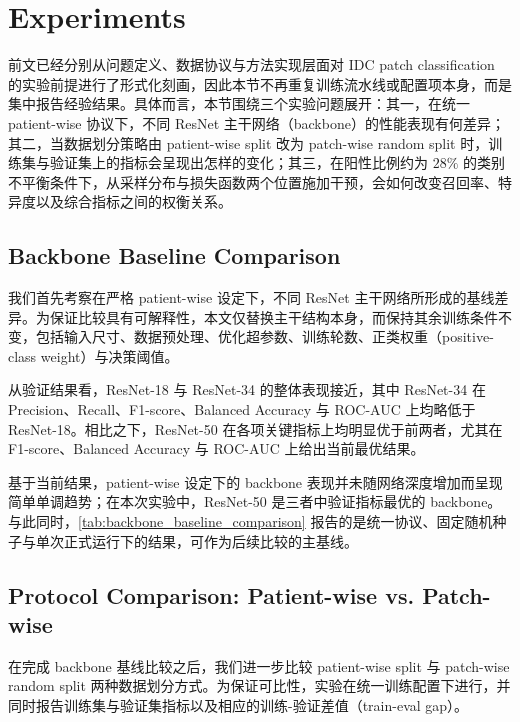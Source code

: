 \section{Experiments}
\label{sec:experiments}

前文已经分别从问题定义、数据协议与方法实现层面对 IDC patch classification 的实验前提进行了形式化刻画，因此本节不再重复训练流水线或配置项本身，而是集中报告经验结果。具体而言，本节围绕三个实验问题展开：其一，在统一 patient-wise 协议下，不同 ResNet 主干网络（backbone）的性能表现有何差异；其二，当数据划分策略由 patient-wise split 改为 patch-wise random split 时，训练集与验证集上的指标会呈现出怎样的变化；其三，在阳性比例约为 $28\%$ 的类别不平衡条件下，从采样分布与损失函数两个位置施加干预，会如何改变召回率、特异度以及综合指标之间的权衡关系。

\subsection{Backbone Baseline Comparison}

我们首先考察在严格 patient-wise 设定下，不同 ResNet 主干网络所形成的基线差异。为保证比较具有可解释性，本文仅替换主干结构本身，而保持其余训练条件不变，包括输入尺寸、数据预处理、优化超参数、训练轮数、正类权重（positive-class weight）与决策阈值。



从验证结果看，ResNet-18 与 ResNet-34 的整体表现接近，其中 ResNet-34 在 Precision、Recall、F1-score、Balanced Accuracy 与 ROC-AUC 上均略低于 ResNet-18。相比之下，ResNet-50 在各项关键指标上均明显优于前两者，尤其在 F1-score、Balanced Accuracy 与 ROC-AUC 上给出当前最优结果。

基于当前结果，patient-wise 设定下的 backbone 表现并未随网络深度增加而呈现简单单调趋势；在本次实验中，ResNet-50 是三者中验证指标最优的 backbone。与此同时，\cref{tab:backbone_baseline_comparison} 报告的是统一协议、固定随机种子与单次正式运行下的结果，可作为后续比较的主基线。

\subsection{Protocol Comparison: Patient-wise vs. Patch-wise}

在完成 backbone 基线比较之后，我们进一步比较 patient-wise split 与 patch-wise random split 两种数据划分方式。为保证可比性，实验在统一训练配置下进行，并同时报告训练集与验证集指标以及相应的训练-验证差值（train-eval gap）。



